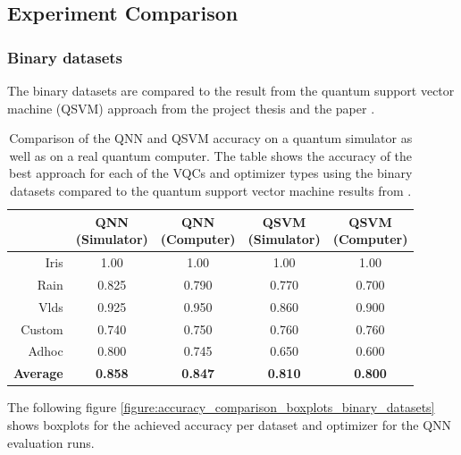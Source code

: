\clearpage
\subsection{Experiment Comparison}

\subsubsection{Binary datasets}
\label{subsubsection:binary_datasets_comparison}
The binary datasets are compared to the result from the quantum support vector machine (QSVM) approach from the project thesis \cite{smailovQuantumMachineLearning2021} and the paper \cite{smailovQuantumMachineLearning2021}. 
\begin{table}[!h]
	\centering
	\begin{tabular}{r|cc|cc}
		\hline 
		\thead{Dataset} & \thead{QNN\\(Simulator)} & \thead{QNN\\(Computer)} & \thead{QSVM\\(Simulator)} & \thead{QSVM\\(Computer)} \\
		\hline 
		Iris    & 1.00     & 1.00    & 1.00    & 1.00   \\
		Rain    & 0.825    & 0.790   & 0.770   & 0.700  \\
		Vlds    & 0.925    & 0.950   & 0.860   & 0.900  \\
		Custom  & 0.740    & 0.750   & 0.760   & 0.760  \\
		Adhoc   & 0.800    & 0.745   & 0.650   & 0.600  \\
		\hline
		\textbf{Average}  & \textbf{0.858} & \textbf{0.847} & \textbf{0.810} & \textbf{0.800}  \\
		\hline
	\end{tabular}
	\caption{Comparison of the QNN and QSVM accuracy on a quantum simulator as well as on a real quantum computer. The table shows the accuracy of the best approach for each of the VQCs and optimizer types using the binary datasets compared to the quantum support vector machine results from \cite{smailovQuantumMachineLearning2021,smailovQuantumMachineLearning}.}
	\label{table:comparison_binary_datasets_accuracy}
\end{table}

The following figure \ref{figure:accuracy_comparison_boxplots_binary_datasets} shows boxplots for the achieved accuracy per dataset and optimizer for the QNN evaluation runs.

